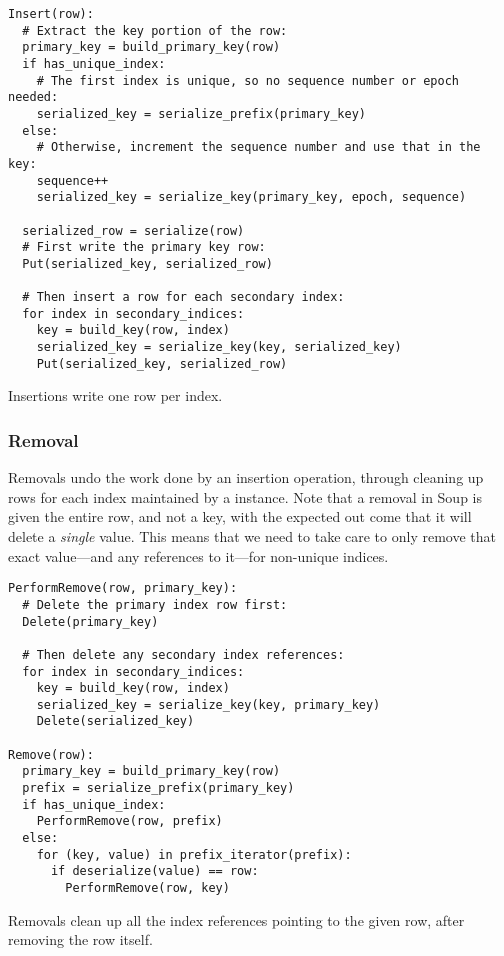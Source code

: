 \begin{listing}[H]
  \begin{verbatim}
Insert(row):
  # Extract the key portion of the row:
  primary_key = build_primary_key(row)
  if has_unique_index:
    # The first index is unique, so no sequence number or epoch needed:
    serialized_key = serialize_prefix(primary_key)
  else:
    # Otherwise, increment the sequence number and use that in the key:
    sequence++
    serialized_key = serialize_key(primary_key, epoch, sequence)

  serialized_row = serialize(row)
  # First write the primary key row:
  Put(serialized_key, serialized_row)

  # Then insert a row for each secondary index:
  for index in secondary_indices:
    key = build_key(row, index)
    serialized_key = serialize_key(key, serialized_key)
    Put(serialized_key, serialized_row)
  \end{verbatim}

  \caption{Insertions write one row per index.}\label{lst:rocksdb-insert}
\end{listing}

\subsubsection{Removal}

Removals undo the work done by an insertion operation, through cleaning up rows
for each index maintained by a  instance. Note that a
removal in Soup is given the entire row, and not a key, with the expected out
come that it will delete a \textit{single} value. This means that we need to
take care to only remove that exact value---and any references to it---for
non-unique indices.

\begin{listing}[H]
  \begin{verbatim}
PerformRemove(row, primary_key):
  # Delete the primary index row first:
  Delete(primary_key)

  # Then delete any secondary index references:
  for index in secondary_indices:
    key = build_key(row, index)
    serialized_key = serialize_key(key, primary_key)
    Delete(serialized_key)

Remove(row):
  primary_key = build_primary_key(row)
  prefix = serialize_prefix(primary_key)
  if has_unique_index:
    PerformRemove(row, prefix)
  else:
    for (key, value) in prefix_iterator(prefix):
      if deserialize(value) == row:
        PerformRemove(row, key)
  \end{verbatim}

  \caption{Removals clean up all the index references pointing to the given row,
  after removing the row itself.}\label{lst:rocksdb-remove}
\end{listing}

